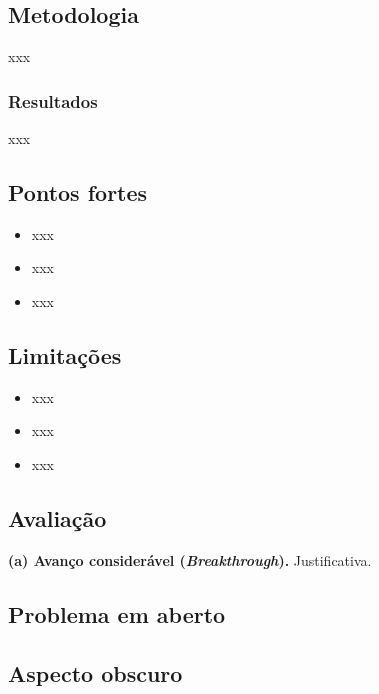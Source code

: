 \subsection{Metodologia}
xxx

\subsubsection{Resultados}
xxx

\subsection{Pontos fortes} %
\begin{itemize}
  \item xxx
  \item xxx
  \item xxx
\end{itemize}  

\subsection{Limitações} %
\begin{itemize}
  \item xxx
  \item xxx
  \item xxx
\end{itemize} 


\subsection{Avaliação}
\textbf{(a) Avanço considerável (\textit{Breakthrough}).}
Justificativa.

\subsection{Problema em aberto}


\subsection{Aspecto obscuro}
